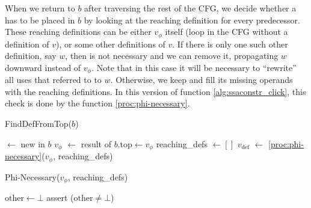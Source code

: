{When we return to $b$ after traversing the rest of the CFG, we decide whether a \phifun has to be placed in $b$ by looking at the reaching definition for every predecessor. 
These reaching definitions can be either $v_\phi$ itself (loop in the CFG without a definition of $v$), or some other definitions of $v$.
If there is only one such other definition, say $w$, then \pendphi is not necessary and we can remove it, propagating $w$ downward instead of $v_\phi$.
Note that in this case it will be necessary to ``rewrite'' all uses that referred to \pendphi to $w$.
Otherwise, we keep \pendphi and fill its missing operands with the reaching definitions.
In this version of function \ref{alg:ssaconstr_click}, this check is done by the function \ref{proc:phi-necessary}.

\begin{procedure}
  \caption{FindDefFromTop($b$)}
  \label{proc:find-def-from-begin}
  \label{alg:ssaconstr_click}
  \pendphi $\gets$ new \phifun in $b$\;
  $v_\phi$ $\gets$ result of \pendphi\;
  $b.\mbox{top} \gets v_\phi$\;
  reaching\_defs $\gets []$\;
  $v_\textrm{def}$ $\gets$ \ref{proc:phi-necessary}($v_\phi$, reaching\_defs)\;
\end{procedure}

\begin{procedure}
  \caption{Phi-Necessary($v_\phi$, reaching\_defs)}
  \label{proc:phi-necessary}
  $\textrm{other} \gets \bot$\;
  assert ($\textrm{other} \ne \bot$)\;
\end{procedure}

}

